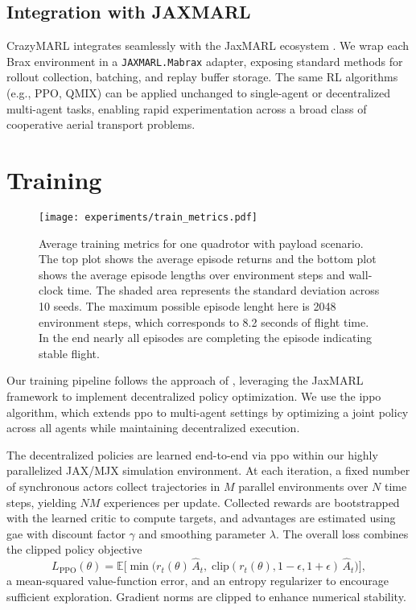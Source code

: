 \subsection{Integration with JAXMARL}

CrazyMARL integrates seamlessly with the JaxMARL ecosystem \cite{flair2023jaxmarl}.  We wrap each Brax environment in a \texttt{JAXMARL.Mabrax} adapter, exposing standard methods for rollout collection, batching, and replay buffer storage.  The same RL algorithms (e.g., PPO, QMIX) can be applied unchanged to single-agent or decentralized multi-agent tasks, enabling rapid experimentation across a broad class of cooperative aerial transport problems.


\section{Training}
\begin{figure}[ht]
    \centering
    
    \texttt{[image: experiments/train\_metrics.pdf]}
    \caption{Average training metrics for one quadrotor with payload scenario. The top plot shows the average episode returns and the bottom plot shows the average episode lengths over environment steps and wall-clock time. The shaded area represents the standard deviation across 10 seeds. The maximum possible episode lenght here is 2048 environment steps, which corresponds to 8.2 seconds of flight time. In the end nearly all episodes are completing the episode indicating stable flight.}
    \label{fig:train_metrics}
\end{figure}
Our training pipeline follows the approach of \autocite{flair2023jaxmarl}, leveraging the JaxMARL framework to implement decentralized policy optimization. We use the \gls{ippo} algorithm, which extends \gls{ppo} to multi-agent settings by optimizing a joint policy across all agents while maintaining decentralized execution.

The decentralized policies are learned end-to-end via \gls{ppo} within our highly parallelized JAX/MJX simulation environment. At each iteration, a fixed number of synchronous actors collect trajectories in $M$ parallel environments over $N$ time steps, yielding $NM$ experiences per update. Collected rewards are bootstrapped with the learned critic to compute targets, and advantages are estimated using \gls{gae} with discount factor $\gamma$ and smoothing parameter $\lambda$. The overall loss combines the clipped policy objective
\[
L_{\mathrm{PPO}}(\theta) = \mathbb{E}\!\bigl[\min\bigl(r_t(\theta)\,\hat{A}_t,\;\mathrm{clip}(r_t(\theta),1-\epsilon,1+\epsilon)\,\hat{A}_t\bigr)\bigr],
\]
a mean-squared value-function error, and an entropy regularizer to encourage sufficient exploration. Gradient norms are clipped to enhance numerical stability.

